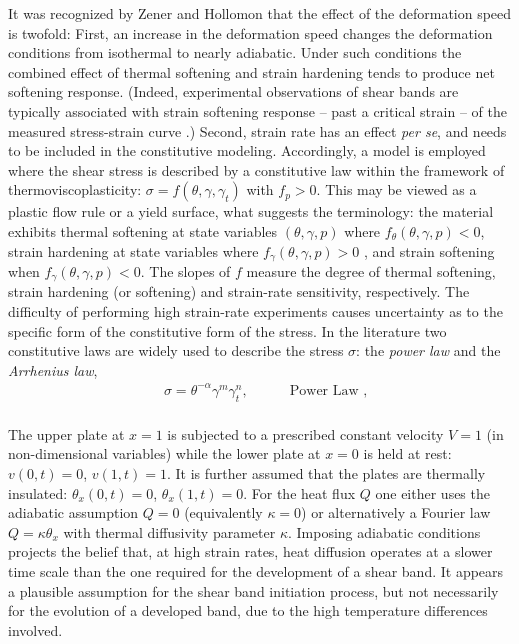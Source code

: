 \documentclass[a4paper,11pt]{article}
\theoremstyle{remark}
\begin{document}
It was recognized by Zener and Hollomon \cite{ZH} that the effect of the deformation speed is twofold:
First, an increase in the deformation speed changes the deformation conditions from isothermal
to nearly adiabatic. Under such conditions the combined effect of thermal softening and strain hardening
tends to produce net softening response. (Indeed, experimental observations of shear bands
are  typically associated  with strain softening response -- past a critical strain --
of the measured stress-strain curve \cite{CDHS}.)
Second, strain rate has an effect {\it per se}, and needs to be included in the constitutive modeling.
Accordingly, a model is employed where  the shear stress is described by a constitutive law
within the framework  of thermoviscoplasticity: $\sigma = f(\theta, \gamma, \gamma_t)$ with $f_p > 0$.
This may be viewed as a plastic flow rule or a yield surface, what suggests the terminology:
the material exhibits thermal softening at state variables $(\theta, \gamma, p)$
where $f_\theta(\theta, \gamma, p) < 0$, strain hardening at state variables where $f_\gamma(\theta, \gamma, p) > 0$ , and strain softening when $f_\gamma(\theta, \gamma, p) < 0$.
The slopes of $f$ measure the degree of thermal softening, strain hardening (or softening)
and strain-rate sensitivity, respectively.
The difficulty of performing high strain-rate experiments causes uncertainty as to the specific form of the constitutive form of the stress.  In the literature two constitutive
laws are widely used to describe the stress $\sigma$:
 the \emph{power law} and the \emph{Arrhenius law},
\begin{align}
&  \sigma =  \theta^{-\alpha} \gamma^{m} \gamma_{t}^{n}, \quad & &  \text{ Power Law }, \label{PL0}\\
\end{align}


The upper plate at $x=1$ is subjected to a prescribed constant velocity $V=1$  (in non-dimensional variables) while the lower plate at $x=0$ is held at rest: $v(0,t) = 0$,  $v(1,t) = 1$.
It is further assumed that the plates are thermally insulated:  $ \theta_{x}(0,t) = 0$,  $\theta_{x}(1,t) = 0$.
For the heat flux $Q$ one either uses the adiabatic assumption $Q = 0$ (equivalently $\kappa = 0$)
or alternatively a Fourier  law $Q = \kappa \theta_{x}$ with thermal diffusivity
parameter $\kappa$.
Imposing adiabatic conditions projects the belief that, at high strain rates,
heat diffusion operates at a slower time scale than the one required for the development
of a shear band. It appears a plausible assumption for the shear band initiation process,
but not necessarily for the evolution of a developed band,
 due to the high temperature differences involved.
\end{document}
